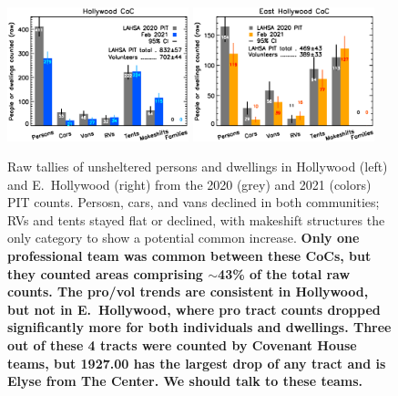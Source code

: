 \documentclass[11pt]{article}
\def\bfr{\bf\color{red}}
\begin{document}
\begin{figure}[h]
	\centering
	\includegraphics[width = 0.47\textwidth, trim = 1cm 0cm 0cm 0cm]{Hwood2021Bars}
	\includegraphics[width = 0.47\textwidth, trim = 1cm 0cm 0cm 0cm]{Eho2021Bars}
	\caption{Raw tallies of unsheltered persons and dwellings in Hollywood (left) and E.~Hollywood
			(right) from the 2020 (grey) and 2021 (colors) PIT counts. Persosn, cars, 
			and vans declined in both communities; RVs and tents stayed flat or declined, with 
			makeshift structures the only category to show a potential common increase. 
			{\bfr Only one professional team was common between these CoCs, but they 
			counted areas comprising $\sim$43\% of the total raw counts. The pro/vol trends are 
			consistent in Hollywood, but not in E.~Hollywood, where pro tract counts dropped
			significantly more for both individuals and dwellings. Three out of these 4 tracts were
			counted by Covenant House teams, but 1927.00 has the largest drop of any tract
			and is Elyse from The Center. We should talk to these teams.}}
	\label{fig:rawCounts}
\end{figure}
\end{document}
